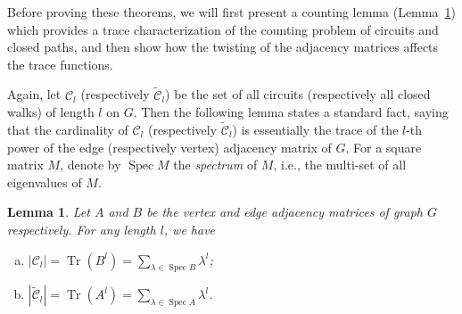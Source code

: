 \documentclass[11pt]{amsart}
\theoremstyle{plain}
\newtheorem{lemma}[theorem]{Lemma}
\theoremstyle{definition}
\newcommand{\mcalC}{{\mathcal C}}
\DeclareMathOperator{\spec}{\operatorname{Spec}}
\DeclareMathOperator{\trace}{\operatorname{Tr}}
\numberwithin{equation}{section}
\begin{document}
Before proving these theorems, we will first present a counting lemma (Lemma~\ref{L:circuit-counting}) which provides a trace characterization of  the counting problem of circuits and closed paths, and then show how the twisting of the adjacency matrices affects the trace functions. 

Again, let $\mcalC_l$ (respectively $\widetilde{\mcalC}_l$) be the set of all circuits (respectively all closed walks) of length $l$ on $G$. Then the following lemma states a standard fact, saying that the cardinality of $\mcalC_l$ (respectively $\widetilde{\mcalC}_l$) is essentially the trace of the $l$-th power of the edge (respectively vertex) adjacency matrix of $G$. For a square matrix $M$, denote by $\spec M$ the \emph{spectrum} of $M$, i.e., the multi-set of all eigenvalues of $M$. 

\begin{lemma}\label{L:circuit-counting}
Let $A$ and $B$ be the vertex and edge adjacency matrices of graph $G$ respectively. For any length $l$, we have
\begin{enumerate}[(a)]
\item $|\mcalC_l|=\trace\left(B^l\right)=\sum_{\lambda\in \spec B}\lambda^l$;
\item $|\widetilde{\mcalC}_l|=\trace\left(A^l\right)=\sum_{\lambda\in \spec A}\lambda^l$.
\end{enumerate}
\end{lemma}
\end{document}
